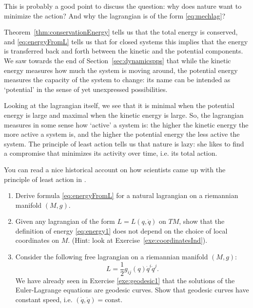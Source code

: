 \documentclass[english,fontsize=11pt,paper=a5,oneside]{scrbook}
\let\d\relax
\DeclareMathOperator{\d}{d}
\theoremstyle{definition}
\newenvironment{remark}
  {\pushQED{\qed}\renewcommand{\qedsymbol}{$\lozenge$}\remarkx}
  {\popQED\endremarkx}
\newenvironment{exercise}
  {\pushQED{\qed}\renewcommand{\qedsymbol}{$\maltese$}\exercisex}
  {\popQED\endexercisex}
\begin{document}
\begin{remark}
    This is probably a good point to discuss the question: why does nature want to minimize the action? And why the lagrangian is of the form \eqref{eq:mechlag}?

    Theorem~\ref{thm:conservationEnergy} tells us that the total energy is conserved, and \eqref{eq:energyFromL} tells us that for closed systems this implies that the energy is transferred back and forth between the kinetic and the potential components.
    We saw towards the end of Section~\ref{sec:dynamicspps} that while the kinetic energy measures how much the system is moving around, the potential energy measures the capacity of the system to change: its name can be intended as `potential' in the sense of yet unexpressed possibilities.

    Looking at the lagrangian itself, we see that it is minimal when the potential energy is large and maximal when the kinetic energy is large.
    So, the lagrangian measures in some sense how `active' a system is: the higher the kinetic energy the more active a system is, and the higher the potential energy the less active the system.
    The principle of least action tells us that nature is lazy: she likes to find a compromise that minimizes its activity over time, i.e. its total action.

    You can read a nice historical account on how scientists came up with the principle of least action in \cite{lectures:baez}.
\end{remark}

\begin{exercise}
    \begin{enumerate}
        \item Derive formula \eqref{eq:energyFromL} for a natural lagrangian on a riemannian manifold $(M,g)$.
        \item Given any lagrangian of the form $L = L(q, \dot q)$ on $TM$, show that the definition of energy \eqref{eq:energy1} does not depend on the choice of local coordinates on $M$. (Hint: look at Exercise~\ref{exe:coordinatesInd}).
        \item Consider the following free lagrangian on a riemannian manifold $(M, g)$:
        \begin{equation}
            L = \frac12 g_{ij}(q)\dot q^i \dot q^j.
        \end{equation}
        We have already seen in Exercise \ref{exe:geodesic1} that the solutions of the Euler-Lagrange equations are geodesic curves.
        Show that geodesic curves have constant speed, i.e. $(\dot q, \dot q) = \mathrm{const}$.
    \end{enumerate}
\end{exercise}
\end{document}
